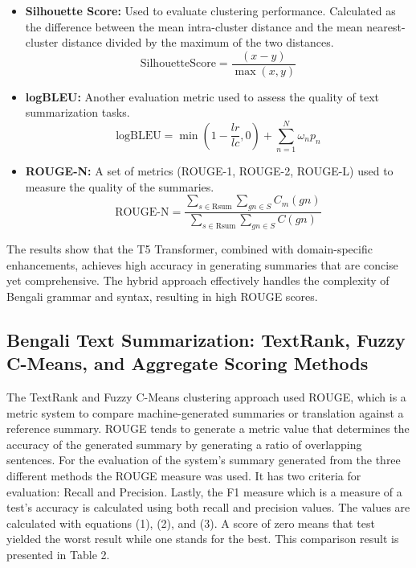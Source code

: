 \documentclass[12pt]{report}
\begin{document}
\begin{itemize}
    \item \textbf{Silhouette Score:} Used to evaluate clustering performance. Calculated as the difference between the mean intra-cluster distance and the mean nearest-cluster distance divided by the maximum of the two distances.
    \begin{equation}
    \text{SilhouetteScore} = \frac{(x - y)}{\max(x, y)}
    \end{equation}
    \item \textbf{logBLEU:} Another evaluation metric used to assess the quality of text summarization tasks.
    \begin{equation}
    \text{logBLEU} = \min\left(1 - \frac{lr}{lc}, 0\right) + \sum_{n=1}^{N} \omega_n p_n
    \end{equation}
    \item \textbf{ROUGE-N:} A set of metrics (ROUGE-1, ROUGE-2, ROUGE-L) used to measure the quality of the summaries.
    \begin{equation}
    \text{ROUGE-N} = \frac{\sum_{s \in \text{Rsum}} \sum_{gn \in S} C_m(gn)}{\sum_{s \in \text{Rsum}} \sum_{gn \in S} C(gn)}
    \end{equation}
\end{itemize}

The results show that the T5 Transformer, combined with domain-specific enhancements, achieves high accuracy in generating summaries that are concise yet comprehensive. The hybrid approach effectively handles the complexity of Bengali grammar and syntax, resulting in high ROUGE scores.

\subsection*{Bengali Text Summarization: TextRank, Fuzzy C-Means, and Aggregate Scoring Methods}
The TextRank and Fuzzy C-Means clustering approach used ROUGE, which is a metric system to compare machine-generated summaries or translation against a reference summary. ROUGE tends to generate a metric value that determines the accuracy of the generated summary by generating a ratio of overlapping sentences. For the evaluation of the system's summary generated from the three different methods the ROUGE measure was used. It has two criteria for evaluation: Recall and Precision. Lastly, the F1 measure which is a measure of a test's accuracy is calculated using both recall and precision values. The values are calculated with equations (1), (2), and (3). A score of zero means that test yielded the worst result while one stands for the best. 
This comparison result is presented in Table 2.
\end{document}
